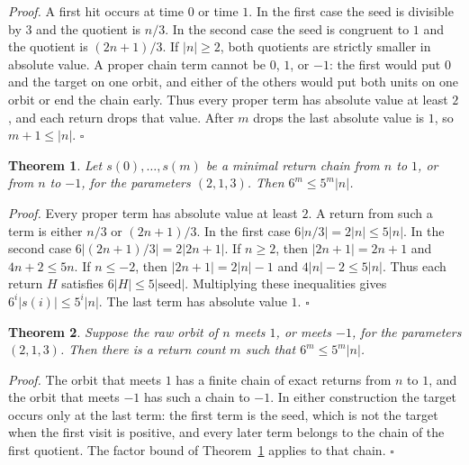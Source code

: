 \documentclass[11pt,letterpaper]{article}
\newtheorem{theorem}{Theorem}
\newenvironment{proof}{\noindent\textit{Proof.}}{\hfill\(\square\)}
\begin{document}
\begin{proof}
A first hit occurs at time \(0\) or time \(1\). In the first case the seed is divisible by \(3\) and the quotient is \(n/3\). In the second case the seed is congruent to \(1\) and the quotient is \((2n+1)/3\). If \(|n|\ge 2\), both quotients are strictly smaller in absolute value. A proper chain term cannot be \(0\), \(1\), or \(-1\): the first would put \(0\) and the target on one orbit, and either of the others would put both units on one orbit or end the chain early. Thus every proper term has absolute value at least \(2\), and each return drops that value. After \(m\) drops the last absolute value is \(1\), so \(m+1\le |n|\).
\end{proof}

\begin{theorem}
\label{thm:sixfive}
Let \(s(0),\ldots,s(m)\) be a minimal return chain from \(n\) to \(1\), or from \(n\) to \(-1\), for the parameters \((2,1,3)\). Then \(6^{m}\le 5^{m}|n|\).
\end{theorem}

\begin{proof}
Every proper term has absolute value at least \(2\). A return from such a term is either \(n/3\) or \((2n+1)/3\). In the first case \(6|n/3|=2|n|\le 5|n|\). In the second case \(6|(2n+1)/3|=2|2n+1|\). If \(n\ge 2\), then \(|2n+1|=2n+1\) and \(4n+2\le 5n\). If \(n\le -2\), then \(|2n+1|=2|n|-1\) and \(4|n|-2\le 5|n|\). Thus each return \(H\) satisfies \(6|H|\le 5|\mathrm{seed}|\). Multiplying these inequalities gives \(6^{i}|s(i)|\le 5^{i}|n|\). The last term has absolute value \(1\).
\end{proof}

\begin{theorem}
\label{thm:hitsixfive}
Suppose the raw orbit of \(n\) meets \(1\), or meets \(-1\), for the parameters \((2,1,3)\). Then there is a return count \(m\) such that \(6^{m}\le 5^{m}|n|\).
\end{theorem}

\begin{proof}
The orbit that meets \(1\) has a finite chain of exact returns from \(n\) to \(1\), and the orbit that meets \(-1\) has such a chain to \(-1\). In either construction the target occurs only at the last term: the first term is the seed, which is not the target when the first visit is positive, and every later term belongs to the chain of the first quotient. The factor bound of Theorem~\ref{thm:sixfive} applies to that chain.
\end{proof}
\end{document}
